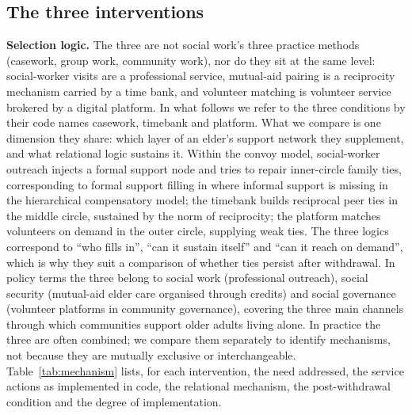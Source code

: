 \documentclass[10pt,twocolumn]{article}
\begin{document}
\subsection{The three interventions}\label{sec:interventions}
\textbf{Selection logic.} The three are not social work's three practice methods (casework, group work, community work), nor do they sit at the same level: social-worker visits are a professional service, mutual-aid pairing is a reciprocity mechanism carried by a time bank, and volunteer matching is volunteer service brokered by a digital platform. In what follows we refer to the three conditions by their code names casework, timebank and platform. What we compare is one dimension they share: which layer of an elder's support network they supplement, and what relational logic sustains it. Within the convoy model\citep{kahn1980convoys}, social-worker outreach injects a formal support node and tries to repair inner-circle family ties, corresponding to formal support filling in where informal support is missing in the hierarchical compensatory model\citep{cantor1979neighbors}; the timebank builds reciprocal peer ties in the middle circle, sustained by the norm of reciprocity\citep{gouldner1960norm}; the platform matches volunteers on demand in the outer circle, supplying weak ties\citep{granovetter1973weak}. The three logics correspond to ``who fills in'', ``can it sustain itself'' and ``can it reach on demand'', which is why they suit a comparison of whether ties persist after withdrawal. In policy terms the three belong to social work (professional outreach), social security (mutual-aid elder care organised through credits) and social governance (volunteer platforms in community governance), covering the three main channels through which communities support older adults living alone. In practice the three are often combined; we compare them separately to identify mechanisms, not because they are mutually exclusive or interchangeable. Table~\ref{tab:mechanism} lists, for each intervention, the need addressed, the service actions as implemented in code, the relational mechanism, the post-withdrawal condition and the degree of implementation.
\end{document}
